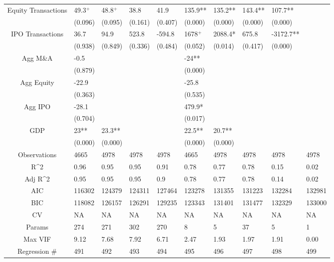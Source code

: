 \documentclass{article}
\begin{document}
\begin{table}[H]
\begin{tabular}{|clllllllll|}
  Equity Transactions & 49.3$^{+}$ & 48.8$^{+}$ & 38.8 & 41.9 & 135.9** & 135.2** & 143.4** & 107.7** &  \\ 
   & (0.096) & (0.095) & (0.161) & (0.407) & (0.000) & (0.000) & (0.000) & (0.000) &  \\ 
  IPO Transactions & 36.7 & 94.9 & 523.8 & -594.8 & 1678$^{+}$ & 2088.4* & 675.8 & -3172.7** &  \\ 
   & (0.938) & (0.849) & (0.336) & (0.484) & (0.052) & (0.014) & (0.417) & (0.000) &  \\ 
  Agg M\&A & -0.5 &  &  &  & -24** &  &  &  &  \\ 
   & (0.879) &  &  &  & (0.000) &  &  &  &  \\ 
  Agg Equity & -22.9 &  &  &  & -25.8 &  &  &  &  \\ 
   & (0.363) &  &  &  & (0.535) &  &  &  &  \\ 
  Agg IPO & -28.1 &  &  &  & 479.9* &  &  &  &  \\ 
   & (0.704) &  &  &  & (0.017) &  &  &  &  \\ 
  GDP & 23** & 23.3** &  &  & 22.5** & 20.7** &  &  &  \\ 
   & (0.000) & (0.000) &  &  & (0.000) & (0.000) &  &  &  \\ 
  \hline 
 Observations & 4665 & 4978 & 4978 & 4978 & 4665 & 4978 & 4978 & 4978 & 4978 \\ 
  R^2 & 0.96 & 0.95 & 0.95 & 0.91 & 0.78 & 0.77 & 0.78 & 0.15 & 0.02 \\ 
  Adj R^2 & 0.95 & 0.95 & 0.95 & 0.9 & 0.78 & 0.77 & 0.78 & 0.14 & 0.02 \\ 
  AIC & 116302 & 124379 & 124311 & 127464 & 123278 & 131355 & 131223 & 132284 & 132981 \\ 
  BIC & 118082 & 126157 & 126291 & 129235 & 123343 & 131401 & 131477 & 132329 & 133000 \\ 
  CV & NA & NA & NA & NA & NA & NA & NA & NA & NA \\ 
  Params & 274 & 271 & 302 & 270 & 8 & 5 & 37 & 5 & 1 \\ 
  Max VIF & 9.12 & 7.68 & 7.92 & 6.71 & 2.47 & 1.93 & 1.97 & 1.91 & 0.00 \\ 
  Regression \# & 491 & 492 & 493 & 494 & 495 & 496 & 497 & 498 & 499 \\ 
   \hline
\end{tabular}
 
\end{table}
\end{document}
